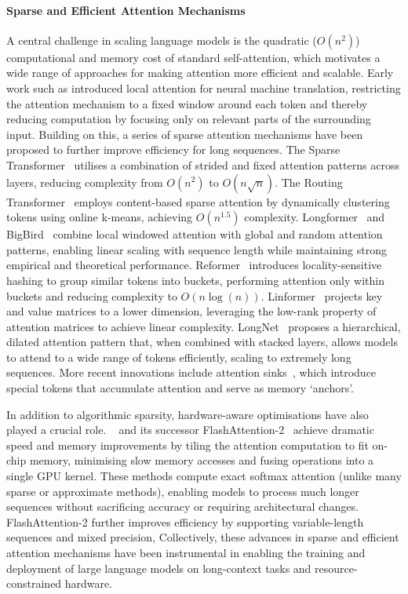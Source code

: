 \paragraph{Sparse and Efficient Attention Mechanisms}
A central challenge in scaling language models is the quadratic ($O(n^2)$) computational and memory cost of standard self-attention, which motivates a wide range of approaches for making attention more efficient and scalable. Early work such as \citet{luong2015effective} introduced local attention for neural machine translation, restricting the attention mechanism to a fixed window around each token and thereby reducing computation by focusing only on relevant parts of the surrounding input. Building on this, a series of sparse attention mechanisms have been proposed to further improve efficiency for long sequences. The Sparse Transformer~\citep{child2019generating} utilises a combination of strided and fixed attention patterns across layers, reducing complexity from $O(n^2)$ to $O(n\sqrt{n})$. The Routing Transformer~\citep{roy2020efficient} employs content-based sparse attention by dynamically clustering tokens using online k-means, achieving $O(n^{1.5})$ complexity. Longformer~\citep{beltagy2020longformer} and BigBird~\citep{zaheer2020big} combine local windowed attention with global and random attention patterns, enabling linear scaling with sequence length while maintaining strong empirical and theoretical performance. Reformer~\citep{kitaev2020reformer} introduces locality-sensitive hashing to group similar tokens into buckets, performing attention only within buckets and reducing complexity to $O(n\log(n))$. Linformer~\citep{wang2020linformer} projects key and value matrices to a lower dimension, leveraging the low-rank property of attention matrices to achieve linear complexity. LongNet~\citep{ding2023longnet} proposes a hierarchical, dilated attention pattern that, when combined with stacked layers, allows models to attend to a wide range of tokens efficiently, scaling to extremely long sequences. More recent innovations include attention sinks~\citep{xiao2023attentionsink}, which introduce special tokens that accumulate attention and serve as memory `anchors'. 


In addition to algorithmic sparsity, hardware-aware optimisations have also played a crucial role. ~\citep{dao2022flashattention} and its successor FlashAttention-2~\citep{dao2023flashattention2} achieve dramatic speed and memory improvements by tiling the attention computation to fit on-chip memory, minimising slow memory accesses and fusing operations into a single GPU kernel. These methods compute exact softmax attention (unlike many sparse or approximate methods), enabling models to process much longer sequences without sacrificing accuracy or requiring architectural changes. FlashAttention-2 further improves efficiency by supporting variable-length sequences and mixed precision,  Collectively, these advances in sparse and efficient attention mechanisms have been instrumental in enabling the training and deployment of large language models on long-context tasks and resource-constrained hardware.

